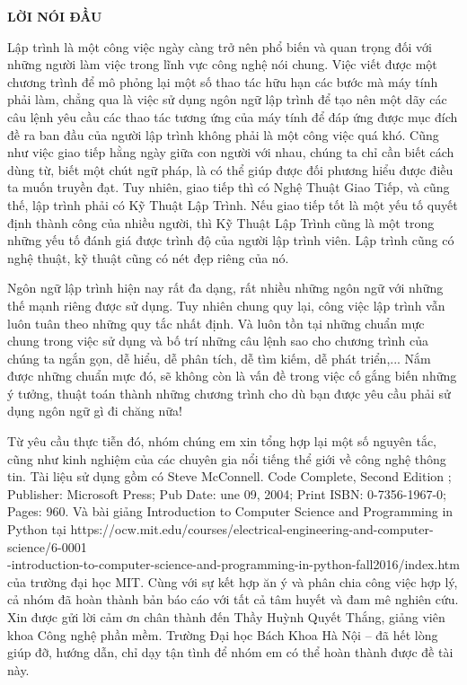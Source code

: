 \documentclass[12pt]{report}
\begin{document}

\newpage
\setcounter{page}{1}
\begin{center}
\LARGE\bfseries LỜI NÓI ĐẦU
\end{center}

Lập trình là một công việc ngày càng trở nên phổ biến và quan trọng đối với những người làm việc trong lĩnh vực công nghệ nói chung. Việc viết được một chương trình để mô phỏng lại một số thao tác hữu hạn các bước mà máy tính phải làm, chẳng qua là việc sử dụng ngôn ngữ lập trình để tạo nên một dãy các câu lệnh yêu cầu các thao tác tương ứng của máy tính để đáp ứng được mục đích đề ra ban đầu của người lập trình không phải là một công việc quá khó. Cũng như việc giao tiếp hằng ngày giữa con người với nhau, chúng ta chỉ cần biết cách dùng từ, biết một chút ngữ pháp, là có thể giúp được đối phương hiểu được điều ta muốn truyền đạt. Tuy nhiên, giao tiếp thì có Nghệ Thuật Giao Tiếp, và cũng thế, lập trình phải có Kỹ Thuật Lập Trình. Nếu giao tiếp tốt là một yếu tố quyết định thành công của nhiều người, thì Kỹ Thuật Lập Trình cũng là một trong những yếu tố đánh giá được trình độ của người lập trình viên. Lập trình cũng có nghệ thuật, kỹ thuật cũng có nét đẹp riêng của nó. 

Ngôn ngữ lập trình hiện nay rất đa dạng, rất nhiều những ngôn ngữ với những thế mạnh riêng được sử dụng. Tuy nhiên chung quy lại, công việc lập trình vẫn luôn tuân theo những quy tắc nhất định. Và luôn tồn tại những chuẩn mực chung trong việc sử dụng và bố trí những câu lệnh sao cho chương trình của chúng ta ngắn gọn, dễ hiểu, dễ phân tích, dễ tìm kiếm, dễ phát triển,... Nắm được những chuẩn mực đó, sẽ không còn là vấn đề trong việc cố gắng biến những ý tưởng, thuật toán thành những chương trình cho dù bạn được yêu cầu phải sử dụng ngôn ngữ gì đi chăng nữa!

Từ yêu cầu thực tiễn đó, nhóm chúng em xin tổng hợp lại một số nguyên tắc, cũng như kinh nghiệm của các chuyên gia nổi tiếng thể giới về công nghệ thông tin. Tài liệu sử dụng gồm có Steve McConnell. Code Complete, Second Edition ; Publisher: Microsoft Press; Pub Date: une 09, 2004; Print ISBN: 0-7356-1967-0; Pages: 960. Và bài giảng Introduction to Computer Science and Programming in Python tại https://ocw.mit.edu/courses/electrical-engineering-and-computer-science/6-0001 \\
-introduction-to-computer-science-and-programming-in-python-fall2016/index.htm của trường đại học MIT. Cùng với sự kết hợp ăn ý và phân chia công việc hợp lý, cả nhóm đã hoàn thành bản báo cáo với tất cả tâm huyết và đam mê nghiên cứu. Xin được gửi lời cảm ơn chân thành đến Thầy Huỳnh Quyết Thắng, giảng viên khoa Công nghệ phần mềm. Trường Đại học Bách Khoa Hà Nội – đã hết lòng giúp đỡ, hướng dẫn, chỉ dạy tận tình để nhóm em có thể hoàn thành được đề tài này.
\end{document}

